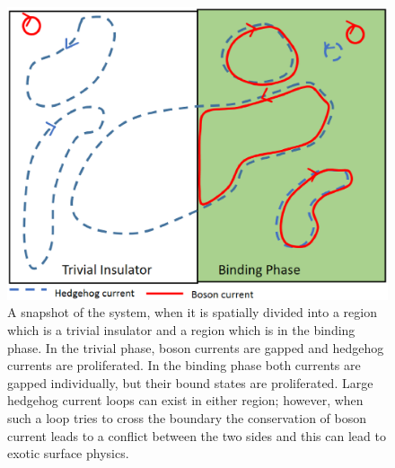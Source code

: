 \documentclass[prb,twocolumn]{revtex4-1}
\begin{document}
\begin{figure}
\includegraphics[width=\linewidth]{figures/surface.eps}
\caption{A snapshot of the system, when it is spatially divided into a region which is a trivial insulator and a region which is in the binding phase. In the trivial phase, boson currents are gapped and hedgehog currents are proliferated. In the binding phase both currents are gapped individually, but their bound states are proliferated. Large hedgehog current loops can exist in either region; however, when such a loop tries to cross the boundary the conservation of boson current leads to a conflict between the two sides and this can lead to exotic surface physics. }
\label{surface}
\end{figure}
\end{document}
